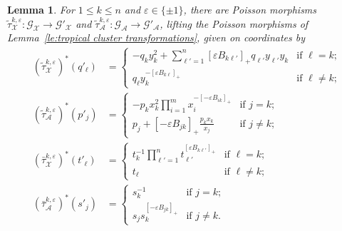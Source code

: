 \documentclass{amsart}
\newtheorem{lemma}[theorem]{Lemma}
\numberwithin{equation}{section}
\newcommand{\cA}{\mathcal{A}}
\newcommand{\cG}{\mathcal{G}}
\newcommand{\cX}{\mathcal{X}}
\begin{document}
\begin{lemma}
  \label{le:tropical groupoid transformations}
  For $1\le k\le n$ and $\varepsilon\in\{\pm1\}$, there are Poisson morphisms $\tilde\tau_\cX^{k,\varepsilon}:\cG_\cX\to\cG'_\cX$ and $\tilde\tau_\cA^{k,\varepsilon}:\cG_\cA\to\cG'_\cA$, lifting the Poisson morphisms of Lemma~\ref{le:tropical cluster transformations}, given on coordinates by
  \begin{align}
    \label{eq:tropical GX transformation}
    (\tilde\tau_\cX^{k,\varepsilon})^*(q'_\ell)
    &=\begin{cases} 
      -q_k y_k^2 + \sum\limits_{\ell'=1}^n [\varepsilon B_{k\ell'}]_+ q_{\ell'} y_{\ell'} y_k & \text{if $\ell=k$;}\\ 
      q_\ell y_k^{-[\varepsilon B_{k\ell}]_+} & \text{if $\ell\ne k$;}
    \end{cases}\\
    \label{eq:tropical GA transformation}
    (\tilde\tau_\cA^{k,\varepsilon})^*(p'_j)&=
    \begin{cases} 
      -p_k x_k^2 \prod\limits_{i=1}^m x_i^{-[-\varepsilon B_{ik}]_+} & \text{if $j=k$;}\\ 
      p_j + [-\varepsilon B_{jk}]_+ \frac{p_k x_k}{x_j} & \text{if $j\ne k$;}
    \end{cases}\\
    \label{eq:tropical DX transformation}
    (\bar\tau_\cX^{k,\varepsilon})^*(t'_\ell)
    &=\begin{cases} 
      t_k^{-1}\prod\limits_{\ell'=1}^n t_{\ell'}^{[\varepsilon B_{k\ell'}]_+} & \text{if $\ell=k$;}\\
      t_\ell & \text{if $\ell\ne k$;}
    \end{cases}\\
    \label{eq:tropical DA transformation}
    (\bar\tau_\cA^{k,\varepsilon})^*(s'_j)
    &=\begin{cases} 
      s_k^{-1} & \text{if $j=k$;}\\ 
      s_j s_k^{[-\varepsilon B_{jk}]_+} & \text{if $j\ne k$.}
    \end{cases}
  \end{align}
\end{lemma}
\end{document}
